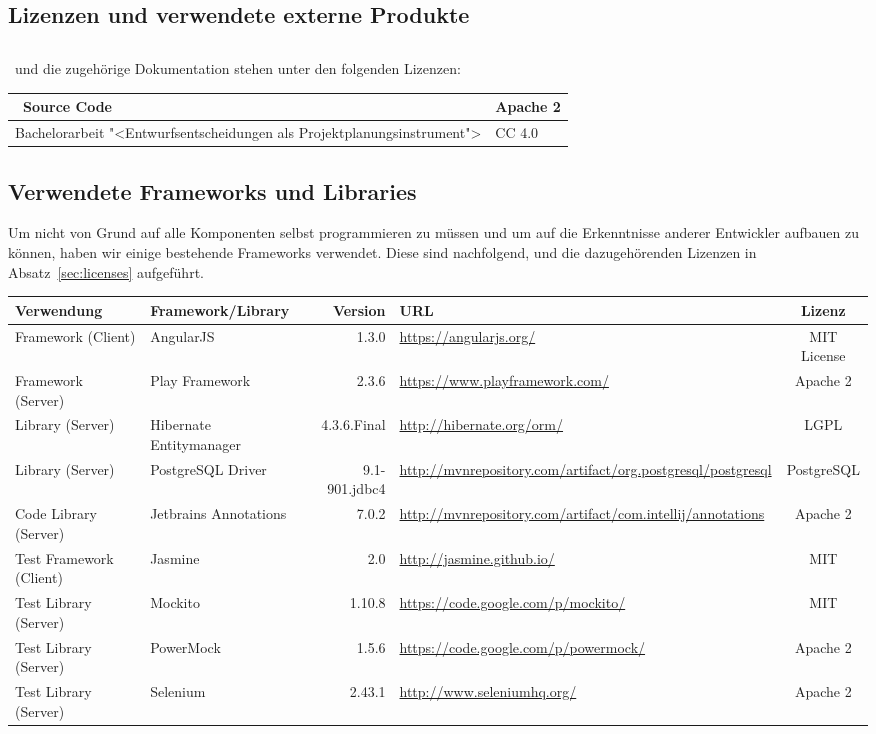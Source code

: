 \begin{landscape}
\chapter{Lizenzen und verwendete externe Produkte}
	\section{\eeppi}
	\label{sec:eeppiLisences}
		
	\eeppi\ und die zugehörige Dokumentation stehen unter den folgenden Lizenzen:
	\vspace{0.5cm}
	
	\noindent
	\begin{tabularx}{\linewidth}{|l|X|}
		\hline
		\eeppi\ Source Code & Apache 2\\
		\hline
		Bachelorarbeit "<Entwurfsentscheidungen als Projektplanungsinstrument"> & CC 4.0\\
		\hline
	\end{tabularx}
	

	\section{Verwendete Frameworks und Libraries}
	\label{sec:usedLibrariesAndFrameworks}
	Um nicht von Grund auf alle Komponenten selbst programmieren zu müssen 
	und um auf die Erkenntnisse anderer Entwickler aufbauen zu können,
	haben wir einige bestehende Frameworks verwendet.
	Diese sind nachfolgend, und die dazugehörenden Lizenzen in Absatz~\ref{sec:licenses} aufgeführt.
	
	\vspace{0.5cm}
	
	\newcommand{\addLib}[5]{
		#5 & #1 & #2 & \url{#3} & #4 \\
		\hline
	}
	
	\noindent
	\begin{tabularx}{\linewidth}{| l | l r | X | c |}
		\hline
		\textbf{Verwendung} & \textbf{Framework/Library} & \textbf{Version} & \textbf{URL} & \textbf{Lizenz} \\
		\hline \hline
		\addLib{AngularJS}{1.3.0}{https://angularjs.org/}{MIT License}{Framework (Client)}
		\addLib{Play Framework}{2.3.6}{https://www.playframework.com/}{Apache 2}{Framework (Server)}
		\addLib{Hibernate Entitymanager}{4.3.6.Final}{http://hibernate.org/orm/}{LGPL}{Library (Server)}
		\addLib{PostgreSQL Driver}{9.1-901.jdbc4}{http://mvnrepository.com/artifact/org.postgresql/postgresql}{PostgreSQL}{Library (Server)}
		\addLib{Jetbrains Annotations}{7.0.2}{http://mvnrepository.com/artifact/com.intellij/annotations}{Apache 2}{Code Library (Server)}
		\addLib{Jasmine}{2.0}{http://jasmine.github.io/}{MIT}{Test Framework (Client)}
		\addLib{Mockito}{1.10.8}{https://code.google.com/p/mockito/}{MIT}{Test Library (Server)}
		\addLib{PowerMock}{1.5.6}{https://code.google.com/p/powermock/}{Apache 2}{Test Library (Server)}
		\addLib{Selenium}{2.43.1}{http://www.seleniumhq.org/}{Apache 2}{Test Library (Server)}
	\end{tabularx}
		

\end{landscape}
